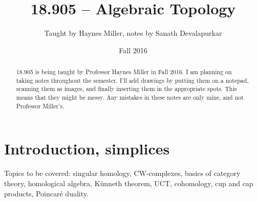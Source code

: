 \documentclass{amsart}
\theoremstyle{theorem}
\theoremstyle{definition}
\begin{document}
\title{18.905 -- Algebraic Topology}
\author{Taught by Haynes Miller, notes by Sanath Devalapurkar}
\date{Fall 2016}
\maketitle
\begin{abstract}
18.905 is being taught by Professor Haynes Miller in Fall 2016. I am planning on taking notes throughout the semester. I'll add drawings by putting them on a notepad, scanning them as images, and finally inserting them in the appropriate spots. This means that they might be messy. Any mistakes in these notes are only mine, and not Professor Miller's.
\end{abstract}
\section{Introduction, simplices}
Topics to be covered: singular homology, CW-complexes, basics of category theory, homological algebra, K\"{u}nneth theorem, UCT, cohomology, cup and cap products, Poincar\'{e} duality.
\end{document}
